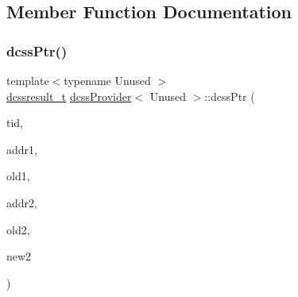 \subsection{Member Function Documentation}
\mbox{\label{classdcssProvider_a0c0f5e01185d19f6ad52673ea7283a7b}} 
\subsubsection{\texorpdfstring{dcss\+Ptr()}{dcssPtr()}}
{\footnotesize\ttfamily template$<$typename Unused $>$ \\
\hyperlink{structdcssresult__t}{dcssresult\+\_\+t} \hyperlink{classdcssProvider}{dcss\+Provider}$<$ Unused $>$\+::dcss\+Ptr (\begin{DoxyParamCaption}\item[{const int}]{tid,  }\item[{\hyperlink{rq__unsafe_8h_ad45142aaf2ff20a036dc6242b8483e9c}{casword\+\_\+t} $\ast$}]{addr1,  }\item[{\hyperlink{rq__unsafe_8h_ad45142aaf2ff20a036dc6242b8483e9c}{casword\+\_\+t}}]{old1,  }\item[{\hyperlink{rq__unsafe_8h_ad45142aaf2ff20a036dc6242b8483e9c}{casword\+\_\+t} $\ast$}]{addr2,  }\item[{\hyperlink{rq__unsafe_8h_ad45142aaf2ff20a036dc6242b8483e9c}{casword\+\_\+t}}]{old2,  }\item[{\hyperlink{rq__unsafe_8h_ad45142aaf2ff20a036dc6242b8483e9c}{casword\+\_\+t}}]{new2 }\end{DoxyParamCaption})\hspace{0.3cm}{\ttfamily [inline]}}

\mbox{\label{classdcssProvider_a6e5e13b1d98ffb7c295e19ed7adad6ea}} 
